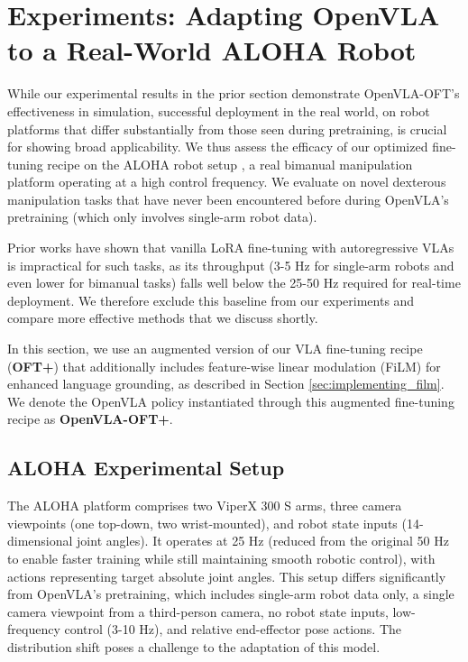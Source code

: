 \documentclass[conference]{IEEEtran}
\begin{document}
\section{Experiments: Adapting OpenVLA to a Real-World ALOHA Robot}
\label{sec:expts_adapting_to_aloha}

While our experimental results in the prior section demonstrate OpenVLA-OFT's effectiveness in simulation, successful deployment in the real world, on robot platforms that differ substantially from those seen during pretraining, is crucial for showing broad applicability. We thus assess the efficacy of our optimized fine-tuning recipe on the ALOHA robot setup \citep{zhao2023learning}, a real bimanual manipulation platform operating at a high control frequency. We evaluate on novel dexterous manipulation tasks that have never been encountered before during OpenVLA's pretraining (which only involves single-arm robot data).

Prior works \citep{wen2024tinyvla, liu2024rdt, black2024pi_0} have shown that vanilla LoRA fine-tuning with autoregressive VLAs \citep{kim2024openvla} is impractical for such tasks, as its throughput (3-5 Hz for single-arm robots and even lower for bimanual tasks) falls well below the 25-50 Hz required for real-time deployment. We therefore exclude this baseline from our experiments and compare more effective methods that we discuss shortly.

In this section, we use an augmented version of our VLA fine-tuning recipe (\textbf{OFT+}) that additionally includes feature-wise linear modulation (FiLM) for enhanced language grounding, as described in Section \ref{sec:implementing_film}. We denote the OpenVLA policy instantiated through this augmented fine-tuning recipe as \textbf{OpenVLA-OFT+}.

\subsection{ALOHA Experimental Setup}

The ALOHA platform comprises two ViperX 300 S arms, three camera viewpoints (one top-down, two wrist-mounted), and robot state inputs (14-dimensional joint angles). It operates at 25 Hz (reduced from the original 50 Hz to enable faster training while still maintaining smooth robotic control), with actions representing target absolute joint angles. This setup differs significantly from OpenVLA's pretraining, which includes single-arm robot data only, a single camera viewpoint from a third-person camera, no robot state inputs, low-frequency control (3-10 Hz), and relative end-effector pose actions. The distribution shift poses a challenge to the adaptation of this model.
\end{document}

